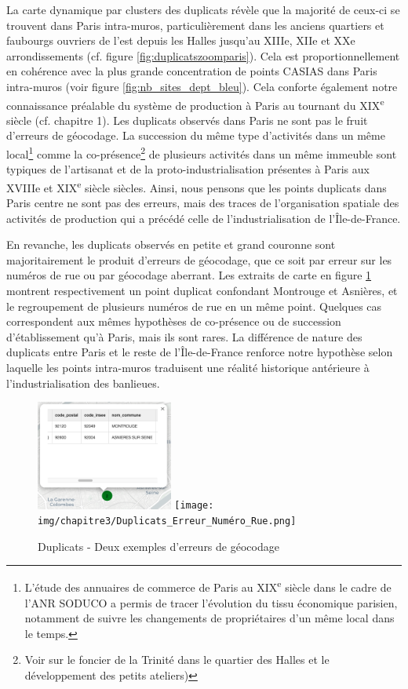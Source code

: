 \documentclass[a4paper,twoside,12pt]{book}
\newcommand{\siecle}[1]{\textsc{#1}\textsuperscript{e} siècle}
\begin{document}
La carte dynamique par clusters des duplicats révèle que la majorité de ceux-ci se trouvent dans Paris intra-muros, particulièrement dans les anciens quartiers et faubourgs ouvriers de l'est depuis les Halles jusqu'au XIIIe, XIIe et XXe arrondissements (cf. figure \ref{fig:duplicatszoomparis}). Cela est proportionnellement en cohérence avec la plus grande concentration de points CASIAS dans Paris intra-muros (voir figure \ref{fig:nb_sites_dept_bleu}). Cela conforte également notre connaissance préalable du système de production à Paris au tournant du \siecle{XIX} (cf. chapitre 1). Les duplicats observés dans Paris ne sont pas le fruit d'erreurs de géocodage. La succession du même type d'activités dans un même local\footnote{L'étude des annuaires de commerce de Paris au \siecle{XIX} dans le cadre de l'ANR SODUCO a permis de tracer l'évolution du tissu économique parisien, notamment de suivre les changements de propriétaires d'un même local dans le temps.} comme la co-présence\footnote{Voir \cite{gribaudi_ruptures_2009} sur le foncier de la Trinité dans le quartier des Halles et le développement des petits ateliers)} de plusieurs activités dans un même immeuble sont typiques de l'artisanat et de la proto-industrialisation présentes à Paris aux XVIIIe et \siecle{XIX} siècles. Ainsi, nous pensons que les points duplicats dans Paris centre ne sont pas des erreurs, mais des traces de l'organisation spatiale des activités de production qui a précédé celle de l'industrialisation de l'Île-de-France. 

En revanche, les duplicats observés en petite et grand couronne sont majoritairement le produit d'erreurs de géocodage, que ce soit par erreur sur les numéros de rue ou par géocodage aberrant. Les extraits de carte en figure \ref{fig:duplicats_erreurs_geocodage} montrent respectivement un point duplicat confondant Montrouge et Asnières, et le regroupement de plusieurs numéros de rue en un même point. Quelques cas correspondent aux mêmes hypothèses de co-présence ou de succession d'établissement qu'à Paris, mais ils sont rares. La différence de nature des duplicats entre Paris et le reste de l'Île-de-France renforce notre hypothèse selon laquelle les points intra-muros traduisent une réalité historique antérieure à l'industrialisation des banlieues.  

\begin{figure}[!h]
\centering
\includegraphics[width=0.4\textwidth]{img/chapitre3/Duplicats_errur_geocodage_Communes.png}
\texttt{[image: img/chapitre3/Duplicats\_Erreur\_Numéro\_Rue.png]}
\caption{Duplicats - Deux exemples d'erreurs de géocodage}
\label{fig:duplicats_erreurs_geocodage}
\end{figure}
\end{document}
